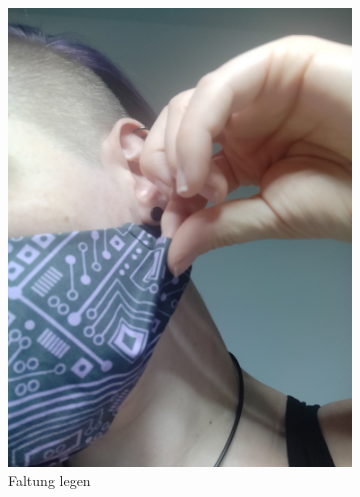 \documentclass[12pt,parskip=full]{scrartcl}
\begin{document}
\begin{figure}[hp]
\begin{subfigure}{0.48\textwidth}
        \includegraphics[width = \linewidth]{Pictures/11_Folding/Folding2.jpg}
        \caption{Faltung legen}
        \label{Folding2}
    \end{subfigure}
    \begin{subfigure}{0.48\textwidth}
        \centering

\end{subfigure}
\end{figure}
\end{document}
